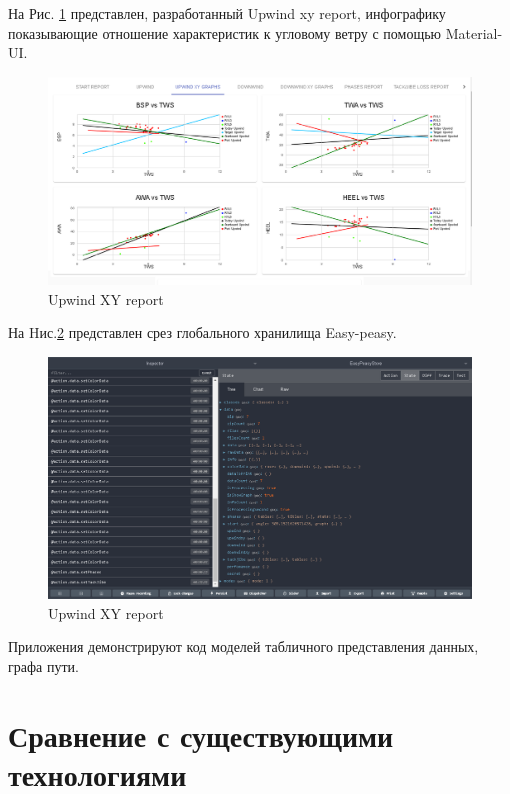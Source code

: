 На Рис. \ref{fig:rgt_XY} представлен, разработанный Upwind xy report, инфографику показывающие отношение характеристик к угловому ветру с помощью Material-UI.

\begin{figure}
	\centering
	\includegraphics[scale=0.35]{my_folder/images/rgt_XY}
	\caption{Upwind XY report}
	\label{fig:rgt_XY}
\end{figure}

На Hис.\ref{fig:easypeasy} представлен срез глобального хранилища Easy-peasy.

\begin{figure}
	\centering
	\includegraphics[scale=0.35]{my_folder/images/easypeasy}
	\caption{Upwind XY report}
	\label{fig:easypeasy}
\end{figure}

Приложения \cite{appendix:RGTMapGraph,appendix:RGTTableGraph,appendix:ReliseRESTfulAPI} демонстрируют код моделей табличного представления данных, графа пути. 

\newpage

\section{Сравнение с существующими технологиями} \label{ch3:sec5}

